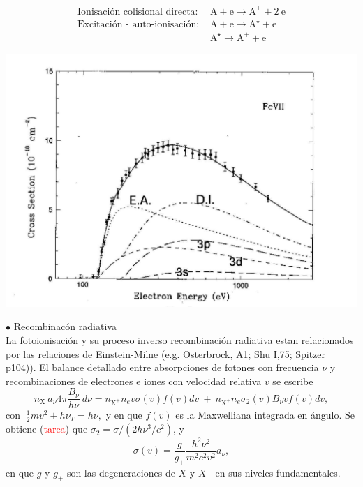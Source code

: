 \vspace{-2cm}
\begin{eqnarray}
\text{Ionisaci\'on colisional directa: }  & \mathrm{A} + \mathrm{e} \rightarrow \mathrm{A^+} + 2~\mathrm{e}   \nonumber \\ 
\text{Excitaci\'on  - auto-ionisaci\'on: }  & \mathrm{A} + \mathrm{e} \rightarrow \mathrm{A^\star} + \mathrm{e}   \nonumber  \\
                                         & \mathrm{A^{\star}}  \rightarrow \mathrm{A^+} + \mathrm{e}   \nonumber  
\end{eqnarray}
\vspace{-2cm}
\begin{center}
  \includegraphics[width=17cm,height=!]{colion_xsec_2.jpg}
\end{center}



{$\bullet$ Recombinac\'on radiativa} \\

La fotoionisaci\'on y su proceso inverso recombinaci\'on radiativa
estan relacionados por las relaciones de Einstein-Milne
(e.g. Osterbrock, A1; Shu I,75; Spitzer p104)).  El balance detallado
entre absorpciones de fotones con frecuencia $\nu$ y recombinaciones
de electrones e iones con velocidad relativa $v$ se escribe
\[
n_\mathrm{X} ~a_\nu 4 \pi \frac{B_\nu}{h \nu} ~d\nu = n_{\mathrm{X}^+} n_e
v \sigma(v) f(v) dv~ +~ n_{\mathrm{X}^+} n_e \sigma_2(v)  B_\nu v f(v) dv,
\]
con $~\frac{1}{2} m v^2 + h \nu_T = h \nu,$ y en que $f(v)$ es la
Maxwelliana integrada en \'angulo. Se obtiene (\textcolor{red}{tarea}) que  
$\sigma_2 = \sigma / (2 h \nu^3 / c^2 )$, y 
\[
\sigma(v) = \frac{g}{g_{+}}   \frac{h^2  \nu^2 }{m^2 c^2 v^2} a_\nu,    
\] 
 en que $g$ y $g_+$ son las degeneraciones de $X$ y $X^+$ en sus
 niveles fundamentales.


